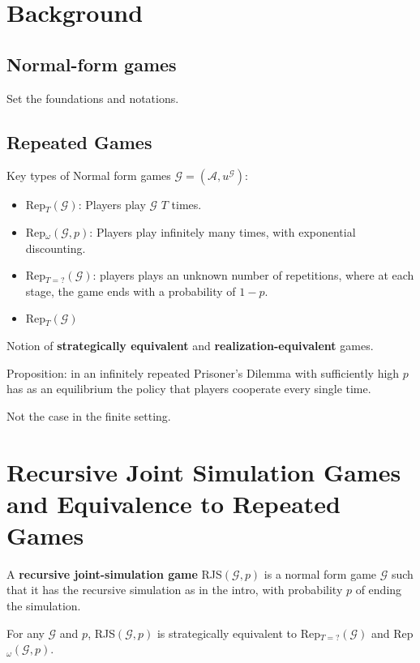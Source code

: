 \documentclass{article}
\begin{document}
\section{Background}
\subsection{Normal-form games}
Set the foundations and notations.

\subsection{Repeated Games}
Key types of Normal form games $\mathcal{G} = (\mathcal{A}, u^\mathcal{G})$: \begin{itemize}
    \item Rep$_T(\mathcal{G})$: Players play $\mathcal{G}$ $T$ times.
    \item Rep$_\omega(\mathcal{G}, p)$: Players play infinitely many times, with exponential discounting.
    \item Rep$_{T=?}(\mathcal{G})$: players plays an unknown number of repetitions, where at each stage, the game ends with a probability of $1-p$.
    \item Rep$_T(\mathcal{G})$
\end{itemize}
Notion of \textbf{strategically equivalent} and \textbf{realization-equivalent} games.

Proposition: in an infinitely repeated Prisoner's Dilemma with sufficiently high $p$ has as an equilibrium the policy that players cooperate every single time.

Not the case in the finite setting.

\section{Recursive Joint Simulation Games and Equivalence to Repeated Games}
\begin{definition}
    A \textbf{recursive joint-simulation game} RJS$(\mathcal{G},p)$ is a normal form game $\mathcal{G}$ such that it has the recursive simulation as in the intro, with probability $p$ of ending the simulation.
\end{definition}
\begin{theorem}
    For any $\mathcal{G}$ and $p$, RJS$(\mathcal{G},p)$ is strategically equivalent to Rep$_{T=?}(\mathcal{G})$ and Rep$_\omega(\mathcal{G}, p)$.
\end{theorem}
\end{document}
